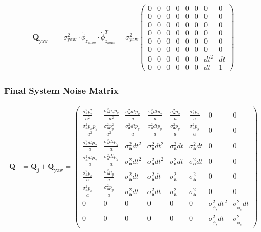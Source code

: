 \documentclass{article}
\begin{document}
\begin{align}
  \textbf{Q}_{\textrm{yaw}} &= \sigma^2_{\textrm{yaw}} \cdot \dot{\phi}_{z_\textrm{noise}} \cdot \dot{\phi}_{z_\textrm{noise}}^T
  = \sigma^2_{\textrm{yaw}} \left(\begin{matrix}0 & 0 & 0 & 0 & 0 & 0 & 0 & 0\\0 & 0 & 0 & 0 & 0 & 0 & 0 & 0\\0 & 0 & 0 & 0 & 0 & 0 & 0 & 0\\0 & 0 & 0 & 0 & 0 & 0 & 0 & 0\\0 & 0 & 0 & 0 & 0 & 0 & 0 & 0\\0 & 0 & 0 & 0 & 0 & 0 & 0 & 0\\0 & 0 & 0 & 0 & 0 & 0 & dt^{2} & dt\\0 & 0 & 0 & 0 & 0 & 0 & dt & 1\end{matrix}\right)
\end{align}

\subsubsection{Final System Noise Matrix}

\begin{align}
  \textbf{Q} &= \textbf{Q}_{\textbf{j}} + \textbf{Q}_{\textrm{yaw}}
  = \left(\begin{matrix}\frac{\sigma^2_\textbf{a} p_{x}^{2}}{a^{2}} & \frac{\sigma^2_\textbf{a} p_{x} p_{y}}{a^{2}} & \frac{\sigma^2_\textbf{a} dt p_{x}}{a} & \frac{\sigma^2_\textbf{a} dt p_{x}}{a} & \frac{\sigma^2_\textbf{a} p_{x}}{a} & \frac{\sigma^2_\textbf{a} p_{x}}{a} & 0 & 0\\\frac{\sigma^2_\textbf{a} p_{x} p_{y}}{a^{2}} & \frac{\sigma^2_\textbf{a} p_{y}^{2}}{a^{2}} & \frac{\sigma^2_\textbf{a} dt p_{y}}{a} & \frac{\sigma^2_\textbf{a} dt p_{y}}{a} & \frac{\sigma^2_\textbf{a} p_{y}}{a} & \frac{\sigma^2_\textbf{a} p_{y}}{a} & 0 & 0\\\frac{\sigma^2_\textbf{a} dt p_{x}}{a} & \frac{\sigma^2_\textbf{a} dt p_{y}}{a} & \sigma^2_\textbf{a} dt^{2} & \sigma^2_\textbf{a} dt^{2} & \sigma^2_\textbf{a} dt & \sigma^2_\textbf{a} dt & 0 & 0\\\frac{\sigma^2_\textbf{a} dt p_{x}}{a} & \frac{\sigma^2_\textbf{a} dt p_{y}}{a} & \sigma^2_\textbf{a} dt^{2} & \sigma^2_\textbf{a} dt^{2} & \sigma^2_\textbf{a} dt & \sigma^2_\textbf{a} dt & 0 & 0\\\frac{\sigma^2_\textbf{a} p_{x}}{a} & \frac{\sigma^2_\textbf{a} p_{y}}{a} & \sigma^2_\textbf{a} dt & \sigma^2_\textbf{a} dt & \sigma^2_\textbf{a} & \sigma^2_\textbf{a} & 0 & 0\\\frac{\sigma^2_\textbf{a} p_{x}}{a} & \frac{\sigma^2_\textbf{a} p_{y}}{a} & \sigma^2_\textbf{a} dt & \sigma^2_\textbf{a} dt & \sigma^2_\textbf{a} & \sigma^2_\textbf{a} & 0 & 0\\0 & 0 & 0 & 0 & 0 & 0 & \sigma_{\dot{\phi_z}}^2 dt^{2} & \sigma_{\dot{\phi_z}}^2 dt\\0 & 0 & 0 & 0 & 0 & 0 & \sigma_{\dot{\phi_z}}^2 dt & \sigma_{\dot{\phi_z}}^2\end{matrix}\right)
\end{align}
\end{document}
